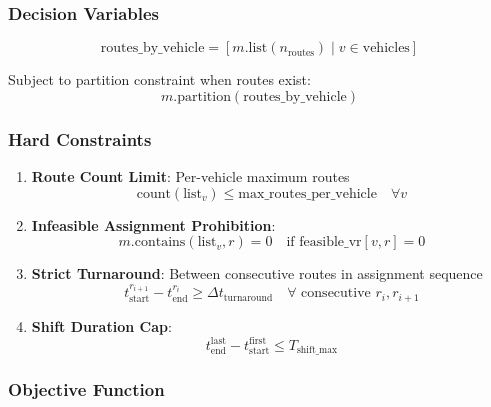 \documentclass[11pt,a4paper]{article}
\begin{document}
\subsubsection{Decision Variables}

\begin{equation}
\text{routes\_by\_vehicle} = \left[ m.\text{list}(n_{\text{routes}}) \mid v \in \text{vehicles} \right]
\end{equation}

Subject to partition constraint when routes exist:
\begin{equation}
m.\text{partition}(\text{routes\_by\_vehicle})
\end{equation}

\subsubsection{Hard Constraints}

\begin{enumerate}
    \item \textbf{Route Count Limit}: Per-vehicle maximum routes
    \begin{equation}
    \text{count}(\text{list}_v) \leq \text{max\_routes\_per\_vehicle} \quad \forall v
    \end{equation}
    
    \item \textbf{Infeasible Assignment Prohibition}:
    \begin{equation}
    m.\text{contains}(\text{list}_v, r) = 0 \quad \text{if } \text{feasible\_vr}[v,r] = 0
    \end{equation}
    
    \item \textbf{Strict Turnaround}: Between consecutive routes in assignment sequence
    \begin{equation}
    t_{\text{start}}^{r_{i+1}} - t_{\text{end}}^{r_i} \geq \Delta t_{\text{turnaround}} \quad \forall \text{ consecutive } r_i, r_{i+1}
    \end{equation}
    
    \item \textbf{Shift Duration Cap}:
    \begin{equation}
    t_{\text{end}}^{\text{last}} - t_{\text{start}}^{\text{first}} \leq T_{\text{shift\_max}}
    \end{equation}
\end{enumerate}

\subsubsection{Objective Function}
\end{document}
